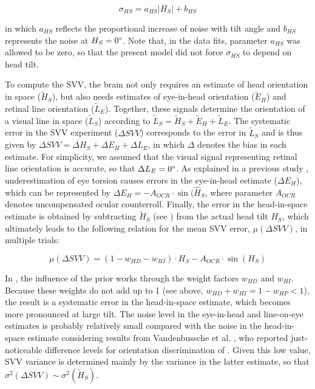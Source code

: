 \begin{equation}
\label{p1:eqn11}
\sigma_{HS} = a_{HS} |H_S| + b_{HS}
\end{equation}

in which $a_{HS}$ reflects the proportional increase of noise with tilt angle and $b_{HS}$ represents the noise at $H_{S} = 0\degree$. Note that, in the data fits, parameter $a_{HS}$ was allowed to be zero, so that the present model did not force $\sigma_{HS}$ to depend on head tilt.

To compute the SVV, the brain not only requires an estimate of head orientation in space ($\tilde{H}_S$), but also needs estimates of eye-in-head orientation ($\tilde{E}_H$) and retinal line orientation ($\tilde{L}_E$). Together, these signals determine the orientation of a visual line in space ($\tilde{L}_S$) according to $\tilde{L}_S = \tilde{H}_S + \tilde{E}_H + \tilde{L}_E$. The systematic error in the SVV experiment (${\Delta}SVV$) corresponds to the error in $\tilde{L}_S$ and is thus given by ${\Delta}SVV = {\Delta}H_S + {\Delta}E_H + {\Delta}L_E$, in which $\Delta$ denotes the bias in each estimate. For simplicity, we assumed that the visual signal representing retinal line orientation is accurate, so that ${\Delta}L_E = 0\degree$. As explained in a previous study \cite{devrijer2009}, underestimation of eye torsion causes errors in the eye-in-head estimate (${\Delta}E_H$), which can be represented by ${\Delta}E_H = -A_{OCR} \cdot \sin(\hat{H}_S$, where parameter $A_{OCR}$ denotes uncompensated ocular counterroll. Finally, the error in the head-in-space estimate is obtained by subtracting $\tilde{H}_S$ (see ) from the actual head tilt $H_S$, which ultimately leads to the following relation for the mean SVV error, $\mu({\Delta}SVV)$, in multiple trials:

\begin{equation}
\label{p1:eqn12}
\mu({\Delta}SVV) = (1 - w_{HD} - w_{HI}) \cdot H_S - A_{OCR} \cdot \sin(H_S)
\end{equation}

In , the influence of the prior works through the weight factors $w_{HD}$ and $w_{HI}$. Because these weights do not add up to 1 (see above, $w_{HD} + w_{HI} = 1 - w_{HP} < 1$), the result is a systematic error in the head-in-space estimate, which becomes more pronounced at large tilt. The noise level in the eye-in-head and line-on-eye estimates is probably relatively small compared with the noise in the head-in-space estimate considering results from Vandenbussche et al. \citeyear{vandenbussche1986}, who reported just-noticeable difference levels for orientation discrimination of . Given this low value, SVV variance is determined mainly by the variance in the latter estimate, so that $\sigma^2({\Delta}SVV) \sim \sigma^2(\tilde{H}_S)$.


